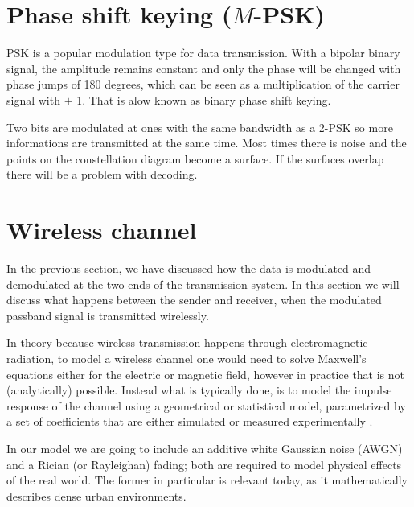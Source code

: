 \section{Phase shift keying (\(M\)-PSK)}

PSK is a popular modulation type for data transmission\cite{Meyer2011}. With a bipolar binary signal, the amplitude remains constant and only the phase will be changed with phase jumps of 180 degrees, which can be seen as a multiplication of the carrier signal with $\pm$ 1. That is alow known as binary phase shift keying.


Two bits are modulated at ones with the same bandwidth as a 2-PSK so more informations are transmitted at the same time. \cite{Meyer2011}
Most times there is noise and the points on the constellation diagram become a surface. 
If the surfaces overlap there will be a problem with decoding. 

\section{Wireless channel}

In the previous section, we have discussed how the data is modulated and demodulated at the two ends of the transmission system. In this section we will discuss what happens between the sender and receiver, when the modulated passband signal is transmitted wirelessly.

In theory because wireless transmission happens through electromagnetic radiation, to model a wireless channel one would need to solve Maxwell's equations either for the electric or magnetic field, however in practice that is not (analytically) possible. Instead what is typically done, is to model the impulse response of the channel using a geometrical or statistical model, parametrized by a set of coefficients that are either simulated or measured experimentally \cite{Gallager}.

In our model we are going to include an additive white Gaussian noise (AWGN) and a Rician (or Rayleighan) fading; both are required to model physical effects of the real world. The former in particular is relevant today, as it mathematically describes dense urban environments.

